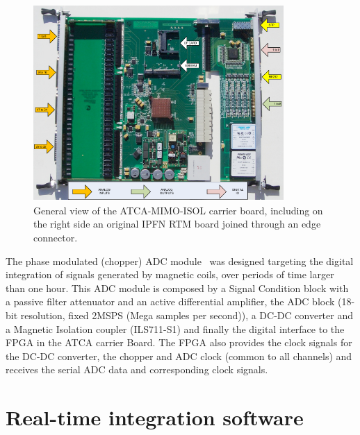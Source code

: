 \begin{figure}[htbp]
	\centering
	\includegraphics[width=0.85\textwidth]{Chp4/ATCA_MIMO_ISOL.png}
	\caption{\label{ATCA_ISOL} General view of the ATCA-MIMO-ISOL carrier board, including on the right side an original IPFN RTM board joined through an edge connector. }
\end{figure}

The phase modulated (chopper) ADC module~\cite{Batista2010} was designed targeting the digital integration of signals generated by magnetic coils, over periods of time larger
than one hour. This ADC module is composed by a  Signal Condition block with a passive filter attenuator and an active differential amplifier, the ADC block (18-bit resolution, fixed 2MSPS (Mega samples per second)), a DC-DC converter and a Magnetic Isolation coupler (ILS711-S1) and finally the digital interface to the FPGA in the ATCA carrier Board. The FPGA also provides the clock signals for the DC-DC converter, the chopper and ADC clock (common to all channels) and receives the serial ADC data and corresponding clock signals.




\section{Real-time  integration software}

